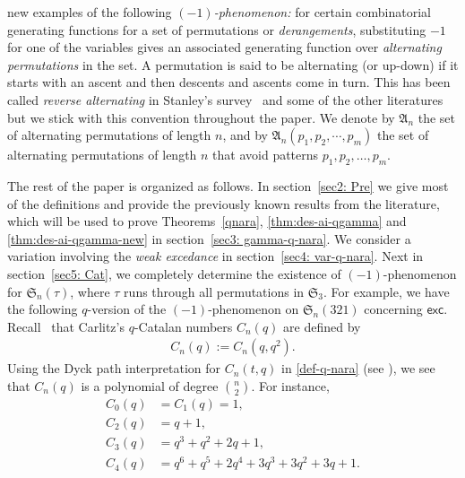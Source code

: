 \documentclass[12pt,reqno]{amsart}
\numberwithin{equation}{section}
\theoremstyle{plain}
\theoremstyle{definition}
\def\S{\mathfrak{S}}
\def\A{\mathfrak{A}}
\def\exc{\mathsf{exc}}
\begin{document}
new examples of the following \emph{$(-1)$-phenomenon:} for certain combinatorial generating functions for a set of permutations or \emph{derangements}, substituting $-1$ for one of the variables gives an associated generating function over \emph{alternating permutations} in the set. A permutation is said to be alternating (or up-down) if it starts with an ascent and then descents and ascents come in turn. This has been called \emph{reverse alternating} in Stanley's survey~\cite{Sta1} and some of the other literatures but we stick with this convention throughout the paper. We denote by $\A_n$ the set of alternating permutations of length $n$, and by $\A_n(p_1,p_2,\cdots,p_m)$ the set of alternating permutations of length $n$ that avoid patterns $p_1,p_2,\ldots,p_m$.











































The rest of the paper is organized as follows. In section~\ref{sec2: Pre} we give most of the definitions and provide the previously known results from the literature, which will be used to prove Theorems~\ref{qnara}, \ref{thm:des-ai-qgamma} and \ref{thm:des-ai-qgamma-new} in section~\ref{sec3: gamma-q-nara}. We consider a variation involving the {\em weak excedance} in section~\ref{sec4: var-q-nara}. Next in section~\ref{sec5: Cat}, we completely determine the existence of $(-1)$-phenomenon for $\S_n(\tau)$, where $\tau$ runs through all permutations in $\S_3$. For example, we have the following $q$-version of the $(-1)$-phenomenon on $\S_n(321)$ concerning $\exc$. Recall~\cite{BP14} that  Carlitz's $q$-Catalan numbers $C_n(q)$ are defined by
\begin{align}
{C}_n(q):=C_n(q,q^2).
\end{align}
Using the  Dyck path interpretation for $C_n(t,q)$ in \eqref{def-q-nara} (see \cite{Fl80}),  we see that $C_n(q)$ is a polynomial of degree $\binom{n}{2}$. For instance,
\begin{align*}
C_0(q) &=C_1(q)=1,\\
C_2(q) &=q+1,\\
C_3(q) &= q^3+q^2+2q+1,\\
C_4(q) &=q^6+q^5+2q^4+3q^3+3q^2+3q+1.
\end{align*}
\end{document}
